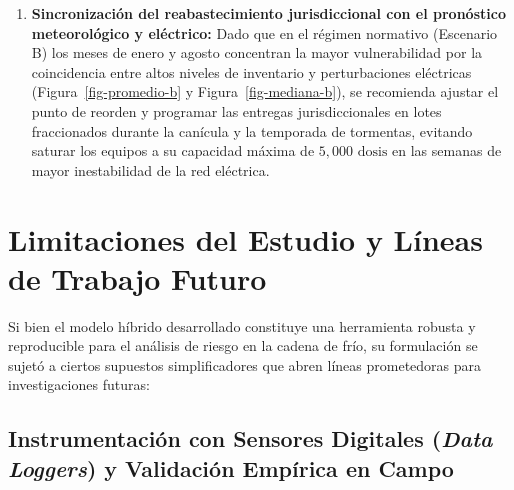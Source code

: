 \documentclass[
  spanish,
  letterpaper,
  DIV=11,
  numbers=noendperiod]{scrreprt}
\theoremstyle{plain}
\theoremstyle{plain}
\theoremstyle{plain}
\theoremstyle{definition}
\theoremstyle{remark}
\begin{document}
\begin{enumerate}
  electromagnéticos o alarmas de apertura en los equipos, así como
  supervisar la colocación permanente de botellas de agua (balasto
  térmico) en la parte superior de las canastillas, lo cual ---según los
  parámetros del NIST (Sección~\ref{sec-salto-termico})--- comprime el
  choque térmico hacia su cota mínima física de \(0.16^\circ\text{C}\)
  por apertura.
\item
  \textbf{Sincronización del reabastecimiento jurisdiccional con el
  pronóstico meteorológico y eléctrico:} Dado que en el régimen
  normativo (Escenario B) los meses de enero y agosto concentran la
  mayor vulnerabilidad por la coincidencia entre altos niveles de
  inventario y perturbaciones eléctricas (Figura~\ref{fig-promedio-b} y
  Figura~\ref{fig-mediana-b}), se recomienda ajustar el punto de reorden
  y programar las entregas jurisdiccionales en lotes fraccionados
  durante la canícula y la temporada de tormentas, evitando saturar los
  equipos a su capacidad máxima de \(5,000\text{ dosis}\) en las semanas
  de mayor inestabilidad de la red eléctrica.
\end{enumerate}

\section{Limitaciones del Estudio y Líneas de Trabajo
Futuro}\label{limitaciones-del-estudio-y-luxedneas-de-trabajo-futuro}

Si bien el modelo híbrido desarrollado constituye una herramienta
robusta y reproducible para el análisis de riesgo en la cadena de frío,
su formulación se sujetó a ciertos supuestos simplificadores que abren
líneas prometedoras para investigaciones futuras:

\subsection{\texorpdfstring{Instrumentación con Sensores Digitales
(\emph{Data Loggers}) y Validación Empírica en
Campo}{Instrumentación con Sensores Digitales (Data Loggers) y Validación Empírica en Campo}}\label{instrumentaciuxf3n-con-sensores-digitales-data-loggers-y-validaciuxf3n-empuxedrica-en-campo}
\end{document}
